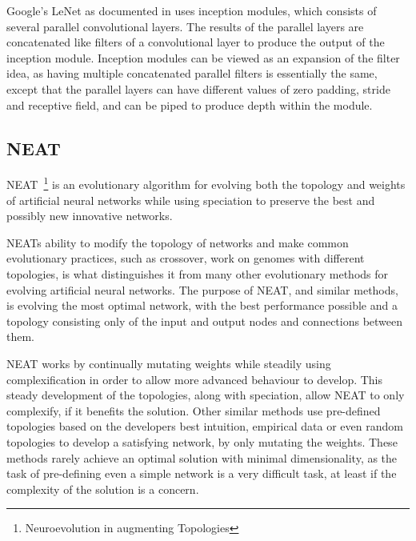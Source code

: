Google's LeNet as documented in \cite{christian} uses inception modules, which consists of several parallel convolutional layers. The results of the parallel layers are concatenated like filters of a convolutional layer to produce the output of the inception module. Inception modules can be viewed as an expansion of the filter idea, as having multiple concatenated parallel filters is essentially the same, except that the parallel layers can have different values of zero padding, stride and receptive field, and can be piped to produce depth within the module.

\subsection{NEAT}
\label{sec:neat}
NEAT~\cite{DBLP:journals/ec/StanleyM02}\footnote{Neuroevolution in augmenting Topologies} is an evolutionary algorithm for evolving both the topology and weights of artificial neural networks while using speciation to preserve the best and possibly new innovative networks.

NEATs ability to modify the topology of networks and make common evolutionary practices, such as crossover, work on genomes with different topologies, is what distinguishes it from many other evolutionary methods for evolving artificial neural networks. The purpose of NEAT, and similar methods, is evolving the most optimal network, with the best performance possible and a topology consisting only of the input and output nodes and connections between them.

NEAT works by continually mutating weights while steadily using complexification in order to allow more advanced behaviour to develop. This steady development of the topologies, along with speciation, allow NEAT to only complexify, if it benefits the solution.
Other similar methods use pre-defined topologies based on the developers best intuition, empirical data or even random topologies to develop a satisfying network, by only mutating the weights. These methods rarely achieve an optimal solution with minimal dimensionality, as the task of pre-defining even a simple network is a very difficult task, at least if the complexity of the solution is a concern.

